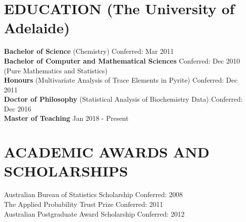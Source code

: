 \documentclass{res}
\begin{document}
 


\address{\bf DETAILS \\ 
		mobile: (+61) 431 955 152 \\
		email: \href{mailto:armadilloa16@gmail.com}{armadilloa16@gmail.com} \\
		eportfolio: \href{https://armadilloa16.github.io/eportfolio/}{armadilloa16.github.io/eportfolio}
}
\address{\bf ADDRESS \\
		3 Hallett Avenue \\  
		Tranmere
		SA 5073 \\
		Australia}
                                  
\begin{resume}

\section{EDUCATION (The University of Adelaide)} 
{\bf Bachelor of Science } (Chemistry) \hfill Conferred: Mar 2011 \\
{\bf Bachelor of Computer and Mathematical Sciences } \hfill Conferred: Dec 2010 \\ 
(Pure Mathematics and Statistics) \\ %
{\bf Honours } (Multivariate Analysis of Trace Elements in Pyrite) \hfill Conferred: Dec 2011  \\
{\bf Doctor of Philosophy } (Statistical Analysis of Biochemistry Data) \hfill Conferred: Dec 2016  \\ %
{\bf Master of Teaching} \hfill Jan 2018 - Present  \\ \vspace{-0.5cm}


\section{ACADEMIC AWARDS AND SCHOLARSHIPS}
Australian Bureau of Statistics Scholarship \hfill Conferred: 2008 \\
The Applied Probability Trust Prize \hfill Conferred: 2011 \\
Australian Postgraduate Award Scholarship \hfill Conferred: 2012 \\ \vspace{-0.5cm}


\end{resume}
\end{document}

